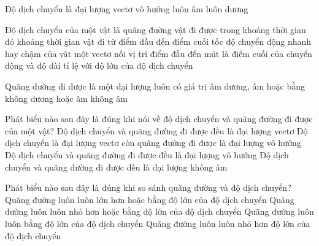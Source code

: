 \begin{ex} Độ dịch chuyển là đại lượng
\choice
{\True vectơ}
{vô hướng}
{luôn âm}
{luôn dương}
\end{ex}

\begin{ex} Độ dịch chuyển của một vật là
\choice
{quãng đường vật đi được trong khoảng thời gian đó}
{khoảng thời gian vật đi từ điểm đầu đến điểm cuối}
{tốc độ chuyển động nhanh hay chậm của vật}
{\True một vectơ nối vị trí điểm đầu đến mút là điểm cuối của chuyển động và độ dài tỉ lệ với độ lớn của độ dịch chuyển}
\end{ex}

\begin{ex} Quãng đường đi được là một đại lượng luôn có giá trị
\choice
{âm}
{dương, âm hoặc bằng không}
{dương hoặc âm}
{\True không âm}
\end{ex}

\begin{ex} Phát biểu nào sau đây là đúng khi nói về độ dịch chuyển và quãng đường đi được của một vật?
\choice
{Độ dịch chuyển và quãng đường đi được đều là đại lượng vectơ}
{\True Độ dịch chuyển là đại lượng vectơ còn quãng đường đi được là đại lượng vô hướng}
{Độ dịch chuyển và quãng đường đi được đều là đại lượng vô hướng}
{Độ dịch chuyển và quãng đường đi được đều là đại lượng không âm}
\end{ex}

\begin{ex} Phát biểu nào sau đây là đúng khi so sánh quãng đường và độ dịch chuyển?
\choice
{\True Quãng đường luôn luôn lớn hơn hoặc bằng độ lớn của độ dịch chuyển}
{Quãng đường luôn luôn nhỏ hơn hoặc bằng độ lớn của độ dịch chuyển}
{Quãng đường luôn luôn bằng độ lớn của độ dịch chuyển}
{Quãng đường luôn luôn nhỏ hơn độ lớn của độ dịch chuyển}
\end{ex}

